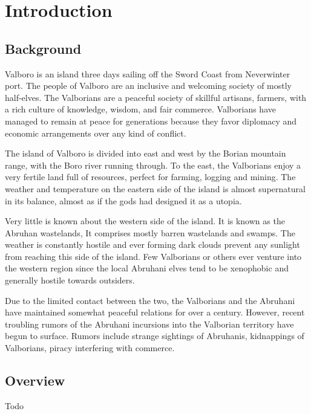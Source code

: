 \section{Introduction}

\begin{multicols*}{2}
	\subsection*{Background}
	Valboro is an island three days sailing off the Sword Coast from Neverwinter port. The people of Valboro are an inclusive and welcoming society of mostly half-elves. The Valborians are a peaceful society of skillful artisans, farmers, with a rich culture of knowledge, wisdom, and fair commerce. Valborians have managed to remain at peace for generations because they favor diplomacy and economic arrangements over any kind of conflict.
	
	The island of Valboro is divided into east and west by the Borian mountain range, with the Boro river running through. To the east, the Valborians enjoy a very fertile land full of resources, perfect for farming, logging and mining. The weather and temperature on the eastern side of the island is almost supernatural in its balance, almost as if the gods had designed it as a utopia. 
	
	Very little is known about the western side of the island. It is known as the Abruhan wastelands, It comprises mostly barren wastelands and swamps. The weather is constantly hostile and ever forming dark clouds prevent any sunlight from reaching this side of the island. Few Valborians or others ever venture into the western region since the local Abruhani elves tend to be xenophobic and generally hostile towards outsiders.
	
	Due to the limited contact between the two, the Valborians and the Abruhani have maintained somewhat peaceful relations for over a century. However, recent troubling rumors of the Abruhani incursions into the Valborian territory have begun to surface. Rumors include strange sightings of Abruhanis, kidnappings of Valborians, piracy interfering with commerce.
	
	\subsection*{Overview}
	Todo
	

\end{multicols*}
